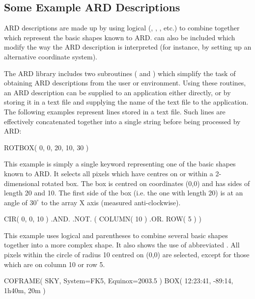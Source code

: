\documentclass[11pt,nolof]{starlink}
\begin{document}
\subsection{Some Example ARD Descriptions}
ARD descriptions are made up by using logical 
(, , ,
etc.) to combine together  which represent the basic shapes known to ARD.
 can also be included which modify the way the ARD description is
interpreted (for instance, by setting up an alternative coordinate system).

The ARD library includes two subroutines ( and
) which
simplify the task of obtaining ARD descriptions from the user or environment.
Using these routines, an ARD description can be supplied to an application
either directly, or by storing it in a text file and supplying the name of the
text file to the application. The following examples represent lines stored in a
text file. Such lines are effectively concatenated together into a single string
before being processed by ARD:

\small
\begin{terminalv}
      ROTBOX( 0, 0, 20, 10, 30 )
\end{terminalv}
\normalsize

This example is simply a single keyword representing one of the basic shapes
known to ARD. It selects all pixels which have centres on or within a
2-dimensional rotated box. The box is centred on coordinates (0,0) and has
sides of length 20 and 10. The first side of the box (i.e. the one with length
20) is at an angle of $30^{\circ}$ \hspace{1mm} to the array X axis (measured
anti-clockwise).

\small
\begin{terminalv}
      CIR( 0, 0, 10 ) .AND. .NOT. ( COLUMN( 10 ) .OR. ROW( 5 ) )
\end{terminalv}
\normalsize

This example uses logical  and parentheses to combine several basic
shapes together into a more complex shape. It also shows the use of abbreviated
. All pixels within the circle of radius 10 centred on (0,0) are
selected, except for those which are on column 10 or row 5.

\small
\begin{terminalv}
      COFRAME( SKY, System=FK5, Equinox=2003.5 )
      BOX( 12:23:41, -89:14, 1h40m, 20m )
\end{terminalv}
\normalsize
\end{document}
